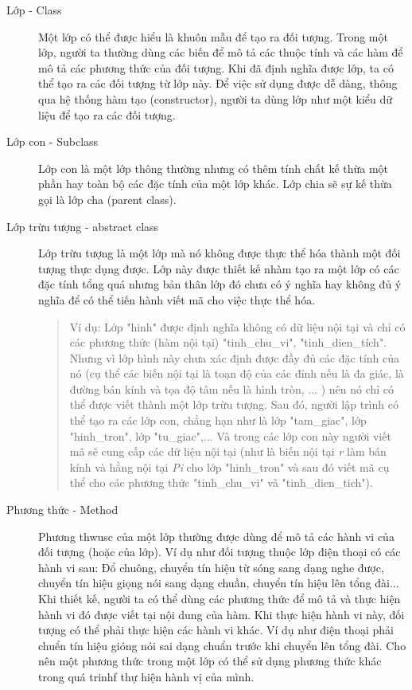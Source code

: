 \documentclass[10pt, a4paper]{article}
\begin{document}
\begin{description}
\item[Lớp - Class] Một lớp có thể được hiểu là khuôn mẫu để tạo ra đối tượng. Trong một lớp, người ta thường dùng các biến để mô tả các thuộc tính và các hàm để mô tả các phương thức của đối tượng. Khi đã định nghĩa được lớp, ta có thể tạo ra các đối tượng từ lớp này. Để việc sử dụng được dễ dàng, thông qua hệ thống hàm tạo (constructor), người ta dùng lớp như một kiểu dữ liệu để tạo ra các đối tượng.
\item[Lớp con - Subclass] Lớp con là một lớp thông thường nhưng có thêm tính chất kế thừa một phần hay toàn bộ các đặc tính của một lớp khác. Lớp chia sẽ sự kế thừa gọi là lớp cha (parent class).
\item[Lớp trừu tượng - abstract class] Lớp trừu tượng là một lớp mà nó không được thực thể hóa thành một đối tượng thực dụng được. Lớp này được thiết kế nhàm tạo ra một lớp có các đặc tính tổng quá nhưng bản thân lớp đó chưa có ý nghĩa hay không đủ ý nghĩa để có thể tiến hành viết mã cho việc thực thể hóa.
\begin{quotation}
Ví dụ: Lớp "hinh" được định nghĩa không có dữ liệu nội tại và chỉ có các phương thức (hàm nội tại) "tinh\_chu\_vi", "tinh\_dien\_tích". Nhưng vì lớp hình này chưa xác định được đầy đủ các đặc tính của nó (cụ thể các biến nội tại là toạn độ của các đỉnh nếu là đa giác, là đường bán kính và tọa độ tâm nếu là hình tròn, ... ) nên nó chỉ có thể được viết thành một lớp trừu tượng. Sau đó, người lập trình có thể tạo ra các lớp con, chẳng hạn như là lớp "tam\_giac", lớp "hinh\_tron", lớp "tu\_giac",... Và trong các lớp con này người viết mã sẽ cung cấp các dữ liệu nội tại (như là biến nội tại \emph{r} làm bán kính và hằng nội tại \emph{Pi} cho lớp "hinh\_tron" và sau đó viết mã cụ thể cho các phương thức "tinh\_chu\_vi" và "tinh\_dien\_tich").
\end{quotation}
\item[Phương thức - Method] Phương thwusc của một lớp thường được dùng để mô tả các hành vi của đối tượng (hoặc của lớp). Ví dụ như đối tượng thuộc lớp điện thoại có các hành vi sau: Đổ chuông, chuyển tín hiệu từ sóng sang dạng nghe được, chuyển tín hiệu giọng nói sang dạng chuần, chuyển tín hiệu lên tổng đài... Khi thiết kế, người ta có thể dùng các phương thức để mô tả và thực hiện hành vi đó được viết tại nội dung của hàm. Khi thực hiện hành vi này, đối tượng có thể phải thực hiện các hành vi khác. Ví dụ như điện thoại phải chuển tín hiệu gióng nói sai dạng chuẩn trước khi chuyển lên tổng đài. Cho nên một phương thức trong một lớp có thể sử dụng phương thức khác trong quá trinhf thự hiện hành vị của mình.\\


\end{description}
\end{document}
